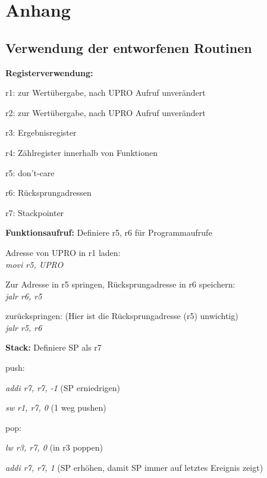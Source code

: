 \documentclass[fleqn, a4paper, 11pt]{article}       %
\begin{document}
\newpage
\appendix %
\section{Anhang}
\subsection{Verwendung der entworfenen Routinen \label{A.Man}}



 \textbf{Registerverwendung:}
 \begin{compactitem}
     \item r1: zur Wertübergabe, nach UPRO Aufruf unverändert
     \item r2: zur Wertübergabe, nach UPRO Aufruf unverändert
     \item r3: Ergebnisregister
     \item r4: Zählregister innerhalb von Funktionen
     \item r5: don't-care
     \item r6: Rücksprungadressen
     \item r7: Stackpointer
 \end{compactitem}
 \vspace{0.25cm}
 \noindent \textbf{Funktionsaufruf:}
     Definiere r5, r6 für Programmaufrufe
     \begin{compactenum}
     \item Adresse von UPRO in r1 laden:\\
         \emph{movi r5, UPRO} 
     \item Zur Adresse in r5 springen, Rücksprungadresse in r6 speichern:\\
         \emph{jalr r6, r5}
     \item zurückspringen: (Hier ist die Rücksprungadresse (r5) unwichtig)\\
         \emph{jalr r5, r6 }
     \end{compactenum}
     
\vspace{0.25cm}
      
 \noindent \textbf{Stack:}
     Definiere SP als r7
     \begin{compactitem}
         \item push:
         \begin {compactitem}
                  \item \emph{addi r7, r7, -1}           (SP erniedrigen)
                   \item \emph{sw  r1, r7, 0 }            (1 weg pushen)
           \end{compactitem}         
         \item pop:
             \begin{compactitem}
                   \item \emph{lw r3, r7, 0 }             (in r3 poppen) 
                   \item \emph{addi r7, r7, 1  }          (SP erhöhen, damit SP immer auf letztes Ereignis zeigt)
             \end{compactitem}                                 
         \end{compactitem}  
 
\end{document}
